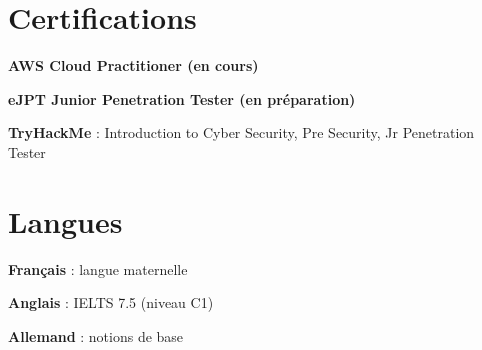 \documentclass[letterpaper,10pt]{article}
\newenvironment{resume_list}{
  \vspace{-5pt}
  \begin{itemize}[itemsep=-2px, leftmargin=30pt]
}{
  \end{itemize}
}
\begin{document}
\section{Certifications}
\begin{resume_list}
\item \textbf{AWS Cloud Practitioner (en cours)}
\item \textbf{eJPT Junior Penetration Tester (en pr\'eparation)}
\item \textbf{TryHackMe} : Introduction to Cyber Security, Pre Security, Jr Penetration Tester
\end{resume_list}

\section{Langues}

\begin{resume_list}
\item \textbf{Fran\c{c}ais} : langue maternelle
\item \textbf{Anglais} : IELTS 7.5 (niveau C1)
\item \textbf{Allemand} : notions de base
\end{resume_list}
\end{document}
